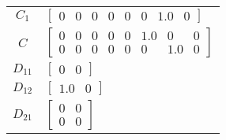 \begin{tabular}{cl}
 $C_{1}$  & $\left[\begin{matrix}0 & 0 & 0 & 0 & 0 & 0 & 1.0 & 0\end{matrix}\right]$                                                                                                                                                                                                                                                                                                     \\
   $C$    & $\left[\begin{matrix}0 & 0 & 0 & 0 & 0 & 1.0 & 0 & 0\\0 & 0 & 0 & 0 & 0 & 0 & 1.0 & 0\end{matrix}\right]$                                                                                                                                                                                                                                                                    \\
 $D_{11}$ & $\left[\begin{matrix}0 & 0\end{matrix}\right]$                                                                                                                                                                                                                                                                                                                               \\
 $D_{12}$ & $\left[\begin{matrix}1.0 & 0\end{matrix}\right]$                                                                                                                                                                                                                                                                                                                             \\
 $D_{21}$ & $\left[\begin{matrix}0 & 0\\0 & 0\end{matrix}\right]$                                                                                                                                                                                                                                                                                                                        \\
\hline
\end{tabular}